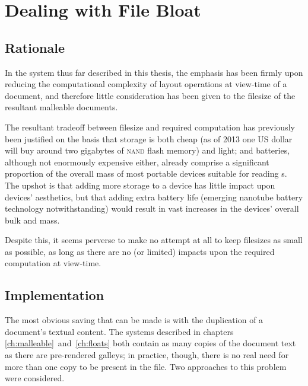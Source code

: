 \chapter{Dealing with File Bloat}\label{ch:bloat}

\section{Rationale}
In the system thus far described in this thesis, the emphasis has been firmly upon reducing the computational complexity of layout operations at view-time of a document, and therefore little consideration has been given to the filesize of the resultant malleable documents.


The resultant tradeoff between filesize and required computation has previously been justified on the basis that storage is both cheap (as of 2013 one US dollar will buy around two gigabytes of \textsc{nand} flash memory) and light; and batteries, although not enormously expensive either, already comprise a significant proportion of the overall mass of most portable devices suitable for reading \ebook{}s. The upshot is that adding more storage to a device has little impact upon devices' aesthetics, but that adding extra battery life (emerging nanotube battery technology notwithstanding) would result in vast increases in the devices' overall bulk and mass.

Despite this, it seems perverse to make no attempt at all to keep filesizes as small as possible, as long as there are no (or limited) impacts upon the required computation at view-time.

\section{Implementation}
The most obvious saving that can be made is with the duplication of a document's textual content. The systems described in chapters \ref{ch:malleable}~and~\ref{ch:floats} both contain as many copies of the document text as there are pre-rendered galleys; in practice, though, there is no real need for more than one copy to be present in the file. Two approaches to this problem were considered.

